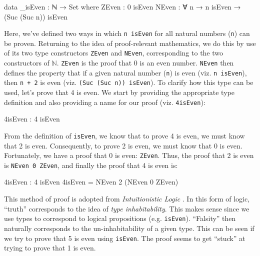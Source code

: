 \documentclass[12pt]{article}
\begin{document}
\begin{center}
\begin{minipage}{0.7\textwidth}
\begin{code}
data _isEven : ℕ → Set where
  ZEven : 0 isEven
  NEven : ∀ n → n isEven → (Suc (Suc n)) isEven
\end{code}
\end{minipage}
\end{center}
Here, we've defined two ways in which {\tt n isEven} for all natural numbers
({\tt n}) can be proven. Returning to the idea of proof-relevant mathematics,
we do this by use of its two type constructors {\tt ZEven} and {\tt NEven},
corresponding to the two constructors of \(\mathbb{N}\). {\tt ZEven} is the
proof that 0 is an even number. {\tt NEven} then defines the property that if
a given natural number ({\tt n}) is even (viz. {\tt n isEven}), then {\tt n + 2}
is even (viz. {\tt (Suc (Suc n)) isEven}). To clarify how this type can be used,
let's prove that 4 is even. We start by providing the appropriate type definition
and also providing a name for our proof (viz. {\tt 4isEven}):
\begin{center}
\begin{minipage}{0.5\textwidth}
\begin{code}
4isEven : 4 isEven
\end{code}
\end{minipage}
\end{center}
From the definition of {\tt isEven}, we know that to prove 4 is even, we must
know that 2 is even. Consequently, to prove 2 is even, we must know that 0 is
even. Fortunately, we have a proof that 0 is even: {\tt ZEven}. Thus, the proof
that 2 is even is {\tt NEven 0 ZEven}, and finally the proof that 4 is even is:
\begin{center}
\begin{minipage}{0.5\textwidth}
\begin{code}
4isEven : 4 isEven
4isEven = NEven 2 (NEven 0 ZEven)
\end{code}
\end{minipage}
\end{center}

This method of proof is adopted from {\em Intuitionistic Logic} \cite{}. In
this form of logic, ``truth'' corresponds to the idea of {\em type inhabitability}.
This makes sense since we use types to correspond to logical propositions
(e.g. {\tt isEven}). ``Falsity'' then naturally corresponds to the un-inhabitability
of a given type. This can be seen if we try to prove that 5 is even using
{\tt isEven}. The proof seems to get ``stuck'' at trying to prove that 1 is even.
\end{document}
